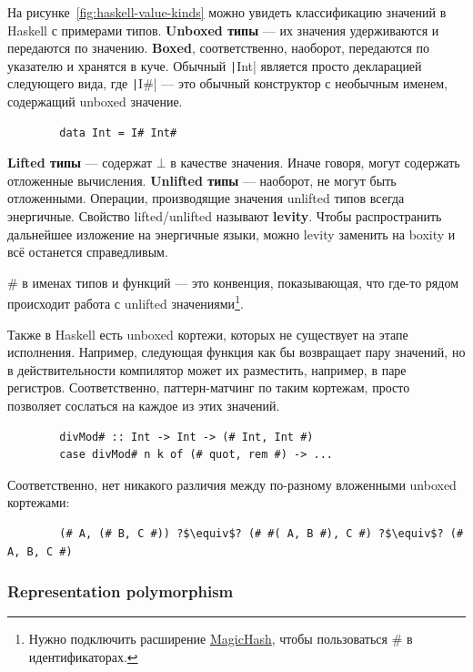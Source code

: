 \documentclass[12pt]{article}
\newcommand{\vocab}[1]{\textbf{#1}} %
\begin{document}
    На рисунке~\ref{fig:haskell-value-kinds} можно увидеть классификацию значений в Haskell с примерами типов.
    \vocab{Unboxed типы} --- их значения удерживаются и передаются по значению.
    \vocab{Boxed}, соответственно, наоборот, передаются по указателю и хранятся в куче.
    Обычный \texttt|Int| является просто декларацией следующего вида, где \texttt|I#| --- это обычный конструктор с необычным именем, содержащий unboxed значение.
    \begin{verbatim}
        data Int = I# Int#
    \end{verbatim}

    \vocab{Lifted типы} --- содержат $\bot$ в качестве значения.
    Иначе говоря, могут содержать отложенные вычисления.
    \vocab{Unlifted типы} --- наоборот, не могут быть отложенными.
    Операции, производящие значения unlifted типов всегда энергичные.
    Свойство lifted/unlifted называют \vocab{levity}.
    Чтобы распространить дальнейшее изложение на энергичные языки, можно levity заменить на boxity и всё останется справедливым.

    \# в именах типов и функций --- это конвенция, показывающая, что где-то рядом происходит работа с unlifted значениями\footnote{Нужно подключить расширение \href{https://ghc.gitlab.haskell.org/ghc/doc/users_guide/exts/magic_hash.html}{MagicHash}, чтобы пользоваться \# в идентификаторах.}.

    Также в Haskell есть unboxed кортежи, которых не существует на этапе исполнения.
    Например, следующая функция как бы возвращает пару значений, но в действительности компилятор может их разместить, например, в паре регистров.
    Соответственно, паттерн-матчинг по таким кортежам, просто позволяет сослаться на каждое из этих значений.
    \begin{verbatim}
        divMod# :: Int -> Int -> (# Int, Int #)
        case divMod# n k of (# quot, rem #) -> ...
    \end{verbatim}
    Соответственно, нет никакого различия между по-разному вложенными unboxed кортежами:
    \begin{verbatim}
        (# A, (# B, C #)) ?$\equiv$? (# #( A, B #), C #) ?$\equiv$? (# A, B, C #)
    \end{verbatim}

    \subsubsection{Representation polymorphism}
\end{document}
